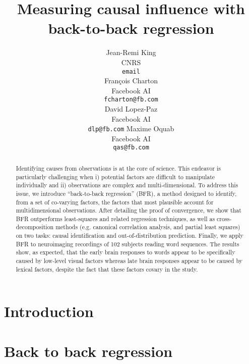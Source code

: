 \documentclass{article}
\title{Measuring causal influence with\\ back-to-back regression}
\author{%
  Jean-Remi King\\
  CNRS\\
  \texttt{email} \\
  \And
  Fran\c{c}ois Charton\\
  Facebook AI\\
  \texttt{fcharton@fb.com}\\
  \And
  David Lopez-Paz\\
  Facebook AI\\
  \texttt{dlp@fb.com}
  \And
  Maxime Oquab\\
  Facebook AI\\
  \texttt{qas@fb.com}
}
\begin{document}
\maketitle

\begin{abstract}
Identifying causes from observations is at the core of science. This endeavor
is particularly challenging when i) potential factors are difficult to
manipulate individually and ii) observations are complex and multi-dimensional.
To address this issue, we introduce ``back-to-back regression'' (BFR), a
method designed to identify, from a set of co-varying factors, the factors
that most plausible account for multidimensional observations. After detailing
the proof of convergence, we show that BFR outperforms least-squares and related
regression techniques, as well as cross-decomposition methods (e.g. canonical
correlation analysis, and partial least squares) on two tasks: causal
identification and out-of-distribution prediction. Finally, we apply BFR to
neuroimaging recordings of 102 subjects reading word sequences. The results
show, as expected, that the early brain responses to words appear to be
specifically caused by low-level visual factors whereas late brain responses
appear to be caused by lexical factors, despite the fact that these factors
covary in the study.
\end{abstract}

\section{Introduction}



\section{Back to back regression}
\end{document}
